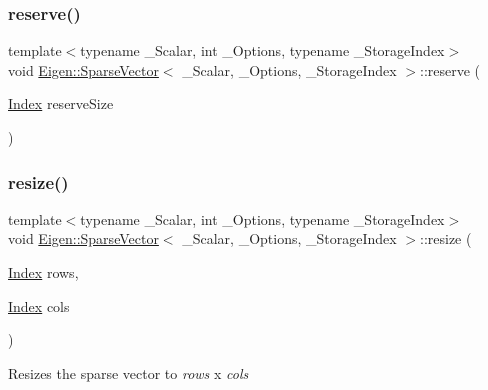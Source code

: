 \subsubsection{\texorpdfstring{reserve()}{reserve()}}
{\footnotesize\ttfamily template$<$typename \+\_\+\+Scalar, int \+\_\+\+Options, typename \+\_\+\+Storage\+Index$>$ \\
void \mbox{\hyperlink{class_eigen_1_1_sparse_vector}{Eigen\+::\+Sparse\+Vector}}$<$ \+\_\+\+Scalar, \+\_\+\+Options, \+\_\+\+Storage\+Index $>$\+::reserve (\begin{DoxyParamCaption}\item[{\mbox{\hyperlink{struct_eigen_1_1_eigen_base_a554f30542cc2316add4b1ea0a492ff02}{Index}}}]{reserve\+Size }\end{DoxyParamCaption})\hspace{0.3cm}{\ttfamily [inline]}}

\mbox{\label{class_eigen_1_1_sparse_vector_a2dc842b3bb2ba3692e210565c48aff3c}} 
\subsubsection{\texorpdfstring{resize()}{resize()}\hspace{0.1cm}{\footnotesize\ttfamily [1/2]}}
{\footnotesize\ttfamily template$<$typename \+\_\+\+Scalar, int \+\_\+\+Options, typename \+\_\+\+Storage\+Index$>$ \\
void \mbox{\hyperlink{class_eigen_1_1_sparse_vector}{Eigen\+::\+Sparse\+Vector}}$<$ \+\_\+\+Scalar, \+\_\+\+Options, \+\_\+\+Storage\+Index $>$\+::resize (\begin{DoxyParamCaption}\item[{\mbox{\hyperlink{struct_eigen_1_1_eigen_base_a554f30542cc2316add4b1ea0a492ff02}{Index}}}]{rows,  }\item[{\mbox{\hyperlink{struct_eigen_1_1_eigen_base_a554f30542cc2316add4b1ea0a492ff02}{Index}}}]{cols }\end{DoxyParamCaption})\hspace{0.3cm}{\ttfamily [inline]}}

Resizes the sparse vector to {\itshape rows} x {\itshape cols} 

